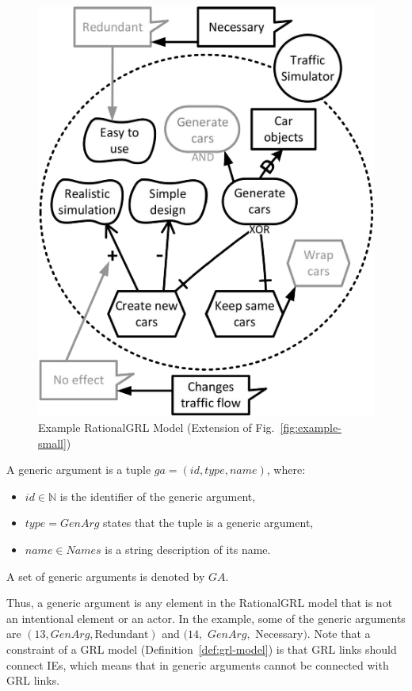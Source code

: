 \begin{figure}[b]
\centering
\includegraphics[width=\columnwidth]{img/Example1-new-attack.pdf}
\caption{Example RationalGRL Model (Extension of Fig.~\ref{fig:example-small})}
\label{fig:example-small3}
\end{figure} 

\begin{definition}
\label{def:generic-argument}
A generic argument is a tuple $ga=(id, type, name)$, where:
\begin{itemize}
\item $id\in \mathbb{N}$ is the identifier of the generic argument,
\item $type = GenArg$ states that the tuple is a generic argument,
\item $name\in Names$ is a string description of its name.
\end{itemize}
A set of generic arguments is denoted by $GA$.
\end{definition}

Thus, a generic argument is any element in the RationalGRL model that is not an intentional element or an actor. In the example, some of the generic arguments are $(13, GenArg, \text{Redundant})$ and $(14,$ $GenArg,$ Necessary$)$. Note that a constraint of a GRL model (Definition~\ref{def:grl-model}) is that GRL links should connect IEs, which means that in generic arguments cannot be connected with GRL links. 
 
